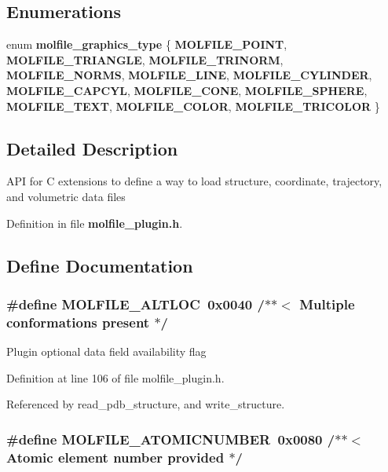 \subsection*{Enumerations}
\begin{CompactItemize}
\item 
enum {\bf molfile\_\-graphics\_\-type} \{ {\bf MOLFILE\_\-POINT}, 
{\bf MOLFILE\_\-TRIANGLE}, 
{\bf MOLFILE\_\-TRINORM}, 
{\bf MOLFILE\_\-NORMS}, 
{\bf MOLFILE\_\-LINE}, 
{\bf MOLFILE\_\-CYLINDER}, 
{\bf MOLFILE\_\-CAPCYL}, 
{\bf MOLFILE\_\-CONE}, 
{\bf MOLFILE\_\-SPHERE}, 
{\bf MOLFILE\_\-TEXT}, 
{\bf MOLFILE\_\-COLOR}, 
{\bf MOLFILE\_\-TRICOLOR}
 \}
\end{CompactItemize}


\subsection{Detailed Description}
 API for C extensions to define a way to load structure, coordinate, trajectory, and volumetric data files



Definition in file {\bf molfile\_\-plugin.h}.

\subsection{Define Documentation}
\subsubsection{\setlength{\rightskip}{0pt plus 5cm}\#define MOLFILE\_\-ALTLOC\ 0x0040 /$\ast$$\ast$$<$ Multiple conformations present   $\ast$/}\label{molfile__plugin_8h_a15}


Plugin optional data field availability flag 

Definition at line 106 of file molfile\_\-plugin.h.

Referenced by read\_\-pdb\_\-structure, and write\_\-structure.
\subsubsection{\setlength{\rightskip}{0pt plus 5cm}\#define MOLFILE\_\-ATOMICNUMBER\ 0x0080 /$\ast$$\ast$$<$ Atomic element number provided   $\ast$/}\label{molfile__plugin_8h_a16}


